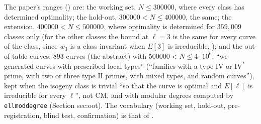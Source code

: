 \begin{sloppypar}
\begin{remark}\label{rem:computation:protocol}
The paper's ranges () are: the working set, $N\le300000$, where every class has determined optimality; the
hold-out, $300000<N\le400000$, the same; the extension, $400000<N\le500000$, where optimality is determined for $359{,}009$ classes only (for the other classes
the bound at $\ell=3$ is the same for every curve of the class, since $w_3$ is a class invariant when $E[3]$ is irreducible, ); and the out-of-table curves: $893$ curves (the abstract)
with $500000<N\le4\cdot10^6$; ``we generated curves with prescribed local types'' (``families with a type $\mathrm{IV}$ or $\mathrm{IV}^*$ prime, with two
or three type $\mathrm{II}$ primes, with mixed types, and random curves''), kept when the isogeny class is trivial ``so that the curve is optimal and
$E[\ell]$ is irreducible for every $\ell$'', not CM, and with modular degrees computed by \texttt{ellmoddegree} (Section sec:oot). The vocabulary
(working set, hold-out, pre-registration, blind test, confirmation) is that of .
\end{remark}


\end{sloppypar}
